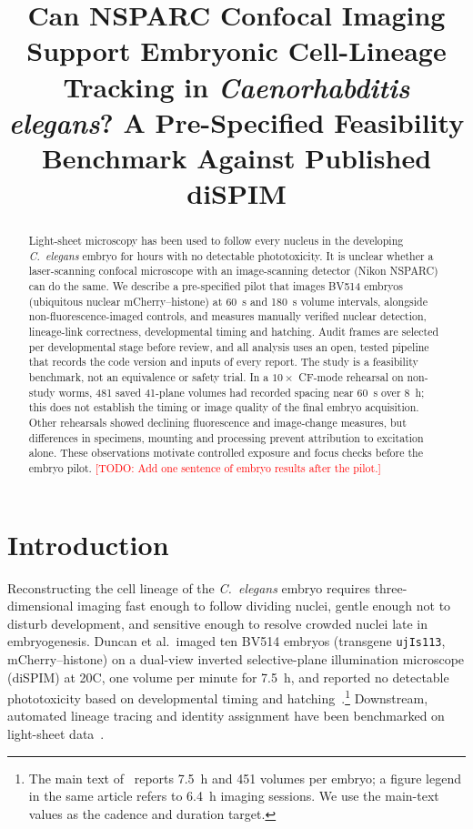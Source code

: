 \documentclass[11pt]{article}
\title{Can NSPARC Confocal Imaging Support Embryonic Cell-Lineage Tracking in
\textit{Caenorhabditis elegans}? A Pre-Specified Feasibility Benchmark Against Published diSPIM}
\author{\todo{Authors and affiliations}}
\date{\todo{Date}}
\newcommand{\todo}[1]{\textcolor{red}{[TODO: #1]}}
\begin{document}
\maketitle

\begin{abstract}
Light-sheet microscopy has been used to follow every nucleus in the developing
\textit{C.\ elegans} embryo for hours with no detectable phototoxicity. It is
unclear whether a laser-scanning confocal microscope with an image-scanning detector
(Nikon NSPARC) can do the same. We describe a pre-specified pilot that images
BV514 embryos (ubiquitous nuclear mCherry--histone) at 60~s and 180~s volume
intervals, alongside non-fluorescence-imaged controls, and measures manually
verified nuclear detection, lineage-link correctness, developmental timing and
hatching. Audit frames are selected per developmental stage before review, and all
analysis uses an open, tested pipeline that records the code version and inputs of
every report. The study is a feasibility benchmark, not an equivalence or safety trial.
In a $10\times$ CF-mode rehearsal on non-study worms, 481 saved 41-plane volumes
had recorded spacing near 60~s over 8~h; this does not establish the timing or
image quality of the final embryo acquisition. Other rehearsals showed declining
fluorescence and image-change measures, but differences in specimens, mounting
and processing prevent attribution to excitation alone. These observations motivate
controlled exposure and focus checks before the embryo pilot.
\todo{Add one sentence of embryo results after the pilot.}
\end{abstract}

\section{Introduction}
Reconstructing the cell lineage of the \textit{C.\ elegans} embryo requires
three-dimensional imaging fast enough to follow dividing nuclei, gentle enough
not to disturb development, and sensitive enough to resolve crowded nuclei late in
embryogenesis. Duncan et al.\ imaged ten BV514 embryos (transgene \texttt{ujIs113},
mCherry--histone) on a dual-view inverted selective-plane illumination microscope
(diSPIM) at 20\textdegree C, one volume per minute for 7.5~h, and reported no
detectable phototoxicity based on developmental timing and hatching~\cite{duncan2019}.\footnote{The
main text of~\cite{duncan2019} reports 7.5~h and 451 volumes per embryo; a figure legend
in the same article refers to 6.4~h imaging sessions. We use the main-text values as the
cadence and duration target.}
Downstream, automated lineage tracing and identity assignment have been
benchmarked on light-sheet data~\cite{tran2026}.
\end{document}

